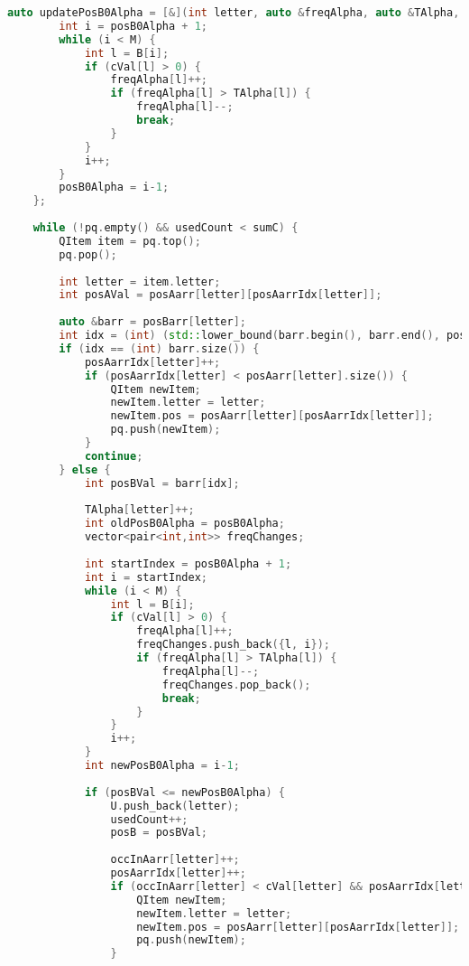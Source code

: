 \begin{lstlisting}[language=C++]
    auto updatePosB0Alpha = [&](int letter, auto &freqAlpha, auto &TAlpha, int &posB0Alpha, int M) {
        int i = posB0Alpha + 1;
        while (i < M) {
            int l = B[i];
            if (cVal[l] > 0) {
                freqAlpha[l]++;
                if (freqAlpha[l] > TAlpha[l]) {
                    freqAlpha[l]--;
                    break;
                }
            }
            i++;
        }
        posB0Alpha = i-1;
    };
 
    while (!pq.empty() && usedCount < sumC) {
        QItem item = pq.top();
        pq.pop();
 
        int letter = item.letter;
        int posAVal = posAarr[letter][posAarrIdx[letter]];
 
        auto &barr = posBarr[letter];
        int idx = (int) (std::lower_bound(barr.begin(), barr.end(), posB + 1) - barr.begin());
        if (idx == (int) barr.size()) {
            posAarrIdx[letter]++;
            if (posAarrIdx[letter] < posAarr[letter].size()) {
                QItem newItem;
                newItem.letter = letter;
                newItem.pos = posAarr[letter][posAarrIdx[letter]];
                pq.push(newItem);
            }
            continue;
        } else {
            int posBVal = barr[idx];
 
            TAlpha[letter]++;
            int oldPosB0Alpha = posB0Alpha;
            vector<pair<int,int>> freqChanges;
 
            int startIndex = posB0Alpha + 1;
            int i = startIndex;
            while (i < M) {
                int l = B[i];
                if (cVal[l] > 0) {
                    freqAlpha[l]++;
                    freqChanges.push_back({l, i});
                    if (freqAlpha[l] > TAlpha[l]) {
                        freqAlpha[l]--;
                        freqChanges.pop_back();
                        break;
                    }
                }
                i++;
            }
            int newPosB0Alpha = i-1;
 
            if (posBVal <= newPosB0Alpha) {
                U.push_back(letter);
                usedCount++;
                posB = posBVal;
 
                occInAarr[letter]++;
                posAarrIdx[letter]++;
                if (occInAarr[letter] < cVal[letter] && posAarrIdx[letter] < posAarr[letter].size()) {
                    QItem newItem;
                    newItem.letter = letter;
                    newItem.pos = posAarr[letter][posAarrIdx[letter]];
                    pq.push(newItem);
                }
 

\end{lstlisting}
